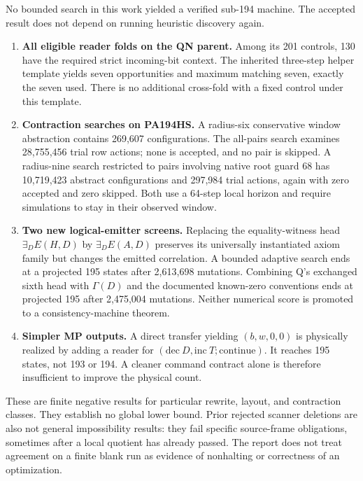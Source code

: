 \documentclass[11pt,letterpaper]{article}
\begin{document}
No bounded search in this work yielded a verified sub-194 machine.
The accepted result does not depend on running heuristic discovery again.

\begin{enumerate}
\item \textbf{All eligible reader folds on the QN parent.} Among its 201
controls, 130 have the required strict incoming-bit context. The inherited
three-step helper template yields seven opportunities and maximum matching
seven, exactly the seven used. There is no additional cross-fold with a
fixed control under this template.
\item \textbf{Contraction searches on PA194HS.} A radius-six conservative
window abstraction contains 269,607 configurations. The all-pairs search
examines 28,755,456 trial row actions; none is accepted, and no pair is
skipped. A radius-nine search restricted to pairs involving native root
guard 68 has 10,719,423 abstract configurations and 297,984 trial actions,
again with zero accepted and zero skipped. Both use a 64-step local horizon
and require simulations to stay in their observed window.
\item \textbf{Two new logical-emitter screens.} Replacing the equality-witness
head $\exists_D E(H,D)$ by $\exists_D E(A,D)$ preserves its universally
instantiated axiom family but changes the emitted correlation. A bounded
adaptive search ends at a projected 195 states after 2,613,698 mutations.
Combining Q's exchanged sixth head with $\Gamma(D)$ and the documented
known-zero conventions ends at projected 195 after 2,475,004 mutations.
Neither numerical score is promoted to a consistency-machine theorem.
\item \textbf{Simpler MP outputs.} A direct transfer yielding
$(b,w,0,0)$ is physically realized by adding a reader for
$(\mathrm{dec}\ D,\mathrm{inc}\ T;\mathrm{continue})$. It reaches 195
states, not 193 or 194. A cleaner command contract alone is therefore
insufficient to improve the physical count.
\end{enumerate}

These are finite negative results for particular rewrite, layout, and
contraction classes. They establish no global lower bound. Prior rejected
scanner deletions are also not general impossibility results: they fail
specific source-frame obligations, sometimes after a local quotient has
already passed. The report does not treat agreement on a finite blank run
as evidence of nonhalting or correctness of an optimization.
\end{document}
